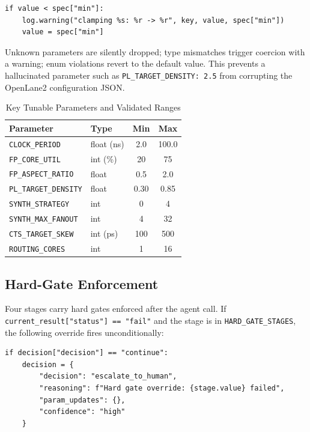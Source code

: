 \documentclass[conference]{IEEEtran}
\begin{document}
\begin{lstlisting}[style=pythonstyle]
if value < spec["min"]:
    log.warning("clamping %s: %r -> %r", key, value, spec["min"])
    value = spec["min"]
\end{lstlisting}

Unknown parameters are silently dropped; type mismatches trigger
coercion with a warning; enum violations revert to the default value.
This prevents a hallucinated parameter such as
\texttt{PL\_TARGET\_DENSITY: 2.5} from corrupting the OpenLane2
configuration JSON.

\begin{table}[t]
\caption{Key Tunable Parameters and Validated Ranges}
\label{tab:params}
\centering
\small
\setlength{\tabcolsep}{4pt}
\begin{tabular}{llcc}
\toprule
\textbf{Parameter} & \textbf{Type} & \textbf{Min} & \textbf{Max} \\
\midrule
\texttt{CLOCK\_PERIOD}       & float (ns) & 2.0  & 100.0 \\
\texttt{FP\_CORE\_UTIL}      & int (\%)   & 20   & 75    \\
\texttt{FP\_ASPECT\_RATIO}   & float      & 0.5  & 2.0   \\
\texttt{PL\_TARGET\_DENSITY} & float      & 0.30 & 0.85  \\
\texttt{SYNTH\_STRATEGY}     & int        & 0    & 4     \\
\texttt{SYNTH\_MAX\_FANOUT}  & int        & 4    & 32    \\
\texttt{CTS\_TARGET\_SKEW}   & int (ps)   & 100  & 500   \\
\texttt{ROUTING\_CORES}      & int        & 1    & 16    \\
\bottomrule
\end{tabular}
\end{table}

\subsection{Hard-Gate Enforcement}

Four stages carry hard gates enforced after the agent call.
If \texttt{current\_result["status"] == "fail"} and the stage is in
\texttt{HARD\_GATE\_STAGES}, the following override fires unconditionally:

\begin{lstlisting}[style=pythonstyle]
if decision["decision"] == "continue":
    decision = {
        "decision": "escalate_to_human",
        "reasoning": f"Hard gate override: {stage.value} failed",
        "param_updates": {},
        "confidence": "high"
    }
\end{lstlisting}
\end{document}
